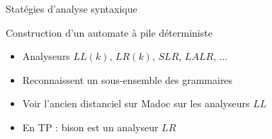 \begin{frame}{Statégies d'analyse syntaxique}
  \begin{block}{Construction d'un automate à pile déterministe}
    \begin{itemize}
    \item Analyseurs $LL(k)$, $LR(k)$, $SLR$, $LALR$, ... 
    \item Reconnaissent un sous-ensemble des grammaires
    \item Voir l'ancien distanciel sur Madoc sur les analyseurs $LL$
    \item En TP : bison est un analyseur $LR$
    \end{itemize}
  \end{block}
\end{frame}



\endgroup

